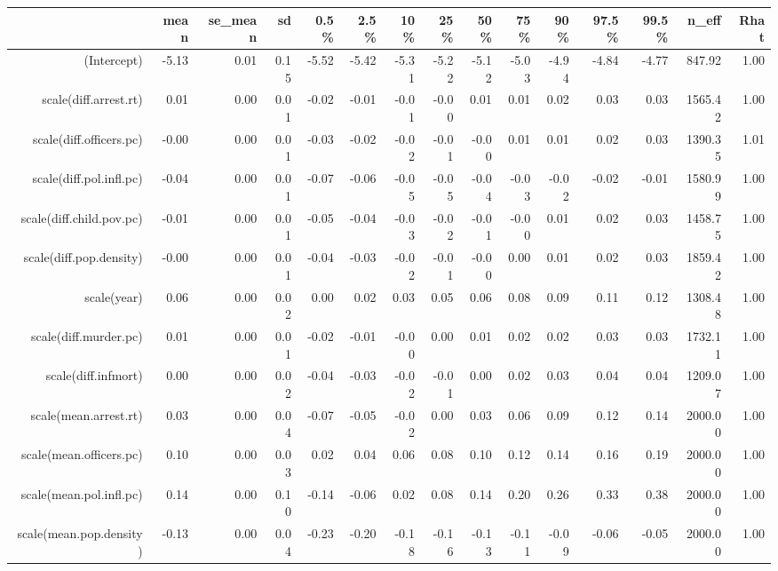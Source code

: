 \begin{table}[ht]
\centering
\begin{tabular}{rrrrrrrrrrrrrrr}
  \hline
 & mean & se\_mean & sd & 0.5\% & 2.5\% & 10\% & 25\% & 50\% & 75\% & 90\% & 97.5\% & 99.5\% & n\_eff & Rhat \\ 
  \hline
(Intercept) & -5.13 & 0.01 & 0.15 & -5.52 & -5.42 & -5.31 & -5.22 & -5.12 & -5.03 & -4.94 & -4.84 & -4.77 & 847.92 & 1.00 \\ 
  scale(diff.arrest.rt) & 0.01 & 0.00 & 0.01 & -0.02 & -0.01 & -0.01 & -0.00 & 0.01 & 0.01 & 0.02 & 0.03 & 0.03 & 1565.42 & 1.00 \\ 
  scale(diff.officers.pc) & -0.00 & 0.00 & 0.01 & -0.03 & -0.02 & -0.02 & -0.01 & -0.00 & 0.01 & 0.01 & 0.02 & 0.03 & 1390.35 & 1.01 \\ 
  scale(diff.pol.infl.pc) & -0.04 & 0.00 & 0.01 & -0.07 & -0.06 & -0.05 & -0.05 & -0.04 & -0.03 & -0.02 & -0.02 & -0.01 & 1580.99 & 1.00 \\ 
  scale(diff.child.pov.pc) & -0.01 & 0.00 & 0.01 & -0.05 & -0.04 & -0.03 & -0.02 & -0.01 & -0.00 & 0.01 & 0.02 & 0.03 & 1458.75 & 1.00 \\ 
  scale(diff.pop.density) & -0.00 & 0.00 & 0.01 & -0.04 & -0.03 & -0.02 & -0.01 & -0.00 & 0.00 & 0.01 & 0.02 & 0.03 & 1859.42 & 1.00 \\ 
  scale(year) & 0.06 & 0.00 & 0.02 & 0.00 & 0.02 & 0.03 & 0.05 & 0.06 & 0.08 & 0.09 & 0.11 & 0.12 & 1308.48 & 1.00 \\ 
  scale(diff.murder.pc) & 0.01 & 0.00 & 0.01 & -0.02 & -0.01 & -0.00 & 0.00 & 0.01 & 0.02 & 0.02 & 0.03 & 0.03 & 1732.11 & 1.00 \\ 
  scale(diff.infmort) & 0.00 & 0.00 & 0.02 & -0.04 & -0.03 & -0.02 & -0.01 & 0.00 & 0.02 & 0.03 & 0.04 & 0.04 & 1209.07 & 1.00 \\ 
  scale(mean.arrest.rt) & 0.03 & 0.00 & 0.04 & -0.07 & -0.05 & -0.02 & 0.00 & 0.03 & 0.06 & 0.09 & 0.12 & 0.14 & 2000.00 & 1.00 \\ 
  scale(mean.officers.pc) & 0.10 & 0.00 & 0.03 & 0.02 & 0.04 & 0.06 & 0.08 & 0.10 & 0.12 & 0.14 & 0.16 & 0.19 & 2000.00 & 1.00 \\ 
  scale(mean.pol.infl.pc) & 0.14 & 0.00 & 0.10 & -0.14 & -0.06 & 0.02 & 0.08 & 0.14 & 0.20 & 0.26 & 0.33 & 0.38 & 2000.00 & 1.00 \\ 
  scale(mean.pop.density) & -0.13 & 0.00 & 0.04 & -0.23 & -0.20 & -0.18 & -0.16 & -0.13 & -0.11 & -0.09 & -0.06 & -0.05 & 2000.00 & 1.00 \\ 

\end{tabular}
\end{table}
